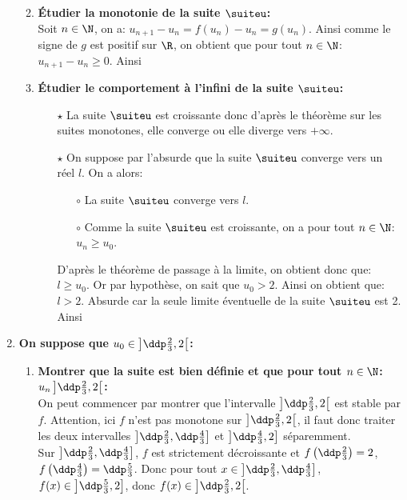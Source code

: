 \documentclass[a4paper, 11pt]{article}
\begin{document}
\begin{correction}
\begin{enumerate}
\begin{enumerate}
\begin{itemize}
\end{itemize}
\item \textbf{\'Etudier la monotonie de la suite $\suiteu$:}\\
\noindent Soit $n\in\N$, on a: $u_{n+1}-u_n=f(u_n)-u_n=g(u_n)$. Ainsi comme le signe de $g$ est positif sur $\R$, on obtient que pour tout $n\in\N$: $u_{n+1}-u_n\geq 0$. Ainsi 
\item \textbf{\'Etudier le comportement \`{a} l'infini de la suite $\suiteu$:}
\begin{itemize}
\item[$\star$] La suite $\suiteu$ est croissante donc d'apr\`{e}s le th\'eor\`{e}me sur les suites monotones, elle converge ou elle diverge vers $+\infty$.
\item[$\star$] On suppose par l'absurde que la suite $\suiteu$ converge vers un r\'eel $l$. On a alors:
\begin{itemize}
\item[$\circ$] La suite $\suiteu$ converge vers $l$.
\item[$\circ$] Comme la suite $\suiteu$ est croissante, on a pour tout $n\in\N$: $u_n\geq u_0$.
\end{itemize}
D'apr\`{e}s le th\'eor\`{e}me de passage \`{a} la limite, on obtient donc que: $l\geq u_0$. Or par hypoth\`{e}se, on sait que $u_0>2$. Ainsi on obtient que: $l>2$. Absurde car la seule limite \'eventuelle de la suite $\suiteu$ est 2. Ainsi 
\end{itemize}
\end{enumerate}
\item \textbf{On suppose que $u_0\in\left\rbrack \ddp\frac{2}{3},2\right\lbrack $:}
\begin{enumerate}
\item \textbf{Montrer que la suite est bien d\'efinie et que pour tout $n\in\N$: $u_n\left\rbrack \ddp\frac{2}{3},2\right\lbrack$:}\\
\noindent On peut commencer par montrer que l'intervalle $\left\rbrack \ddp\frac{2}{3},2\right\lbrack$ est stable par $f$. Attention, ici $f$ n'est pas monotone sur $\left\rbrack \ddp\frac{2}{3},2\right\lbrack$, il faut donc traiter les deux intervalles $\left\rbrack \ddp\frac{2}{3},\ddp\frac{4}{3}\right\rbrack$ et $\left\rbrack \ddp\frac{4}{3}, 2\right\rbrack$ s\'eparemment.\\
Sur $\left\rbrack \ddp\frac{2}{3},\ddp\frac{4}{3}\right\rbrack$, $f$ est strictement d\'ecroissante et $f\left(\ddp\frac{2}{3}\right) = 2$, $f\left(\ddp\frac{4}{3}\right)=\ddp\frac{5}{3}$. Donc pour tout $x \in \left\rbrack \ddp\frac{2}{3},\ddp\frac{4}{3}\right\rbrack$, $f(x) \in \left\rbrack \ddp\frac{5}{3},2\right\rbrack$, donc $f(x) \in \left\rbrack \ddp\frac{2}{3},2\right\lbrack$.\\

\end{enumerate}
\end{enumerate}
\end{correction}
\end{document}
